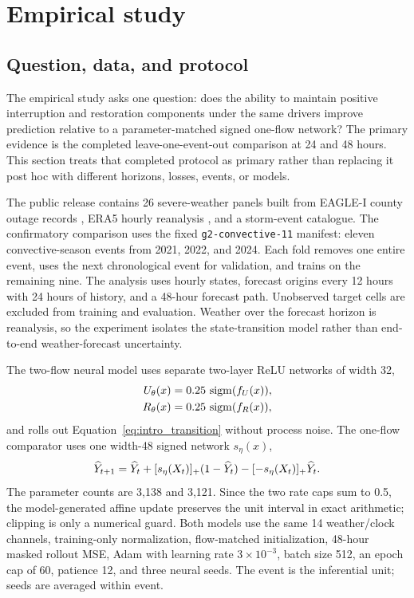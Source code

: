\section{Empirical study}
\label{sec:experiments}

\subsection{Question, data, and protocol}

The empirical study asks one question: does the ability to maintain positive interruption and restoration components under the same drivers improve prediction relative to a parameter-matched signed one-flow network? The primary evidence is the completed leave-one-event-out comparison at 24 and 48 hours. This section treats that completed protocol as primary rather than replacing it post hoc with different horizons, losses, events, or models.

The public release contains 26 severe-weather panels built from EAGLE-I county outage records \citep{brelsford2024,tansakul2023}, ERA5 hourly reanalysis \citep{hersbach2020}, and a storm-event catalogue. The confirmatory comparison uses the fixed \texttt{g2-convective-11} manifest: eleven convective-season events from 2021, 2022, and 2024. Each fold removes one entire event, uses the next chronological event for validation, and trains on the remaining nine. The analysis uses hourly states, forecast origins every 12 hours with 24 hours of history, and a 48-hour forecast path. Unobserved target cells are excluded from training and evaluation. Weather over the forecast horizon is reanalysis, so the experiment isolates the state-transition model rather than end-to-end weather-forecast uncertainty.

The two-flow neural model uses separate two-layer ReLU networks of width 32,
\begin{align}
U_\theta(x)&=0.25\,\operatorname{sigm}(f_U(x)),\nonumber\\
R_\theta(x)&=0.25\,\operatorname{sigm}(f_R(x)),
\label{eq:neural_rates}
\end{align}
and rolls out Equation~\eqref{eq:intro_transition} without process noise. The one-flow comparator uses one width-48 signed network $s_\eta(x)$,
\begin{equation}
\widehat Y_{t+1}=\widehat Y_t+
[s_\eta(X_t)]_{+}(1-\widehat Y_t)-
[-s_\eta(X_t)]_{+}\widehat Y_t.
\label{eq:one_flow_nn}
\end{equation}
The parameter counts are 3,138 and 3,121. Since the two rate caps sum to 0.5, the model-generated affine update preserves the unit interval in exact arithmetic; clipping is only a numerical guard. Both models use the same 14 weather/clock channels, training-only normalization, flow-matched initialization, 48-hour masked rollout MSE, Adam with learning rate $3\times10^{-3}$, batch size 512, an epoch cap of 60, patience 12, and three neural seeds. The event is the inferential unit; seeds are averaged within event.

